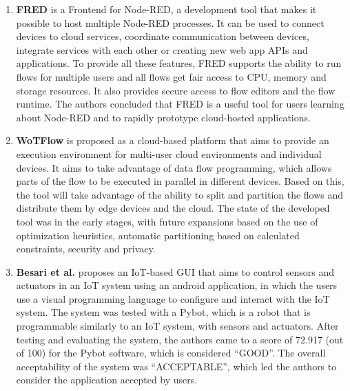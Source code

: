 \begin{enumerate}
    \item \textbf{FRED} \cite{fred} is a Frontend for Node-RED, a development tool that makes it possible to host multiple Node-RED processes. It can be used to connect devices to cloud services, coordinate communication between devices, integrate services with each other or creating new web app APIs and applications. To provide all these features, FRED supports the ability to run flows for multiple users and all flows get fair access to CPU, memory and storage resources. It also provides secure access to flow editors and the flow runtime. The authors concluded that FRED is a useful tool for users learning about Node-RED and to rapidly prototype cloud-hosted applications.
    \item \textbf{WoTFlow} \cite{wotflow_dnr} is proposed as a cloud-based platform that aims to provide an execution environment for multi-user cloud environments and individual devices. It aims to take advantage of data flow programming, which allows parts of the flow to be executed in parallel in different devices. Based on this, the tool will take advantage of the ability to split and partition the flows and distribute them by edge devices and the cloud. The state of the developed tool was in the early stages, with future expansions based on the use of optimization heuristics, automatic partitioning based on calculated constraints, security and privacy.
    \item \textbf{Besari et al.} \cite{mobile_apps_rpi} \cite{pre_mobile_apps_rpi} proposes an IoT-based GUI that aims to control sensors and actuators in an IoT system using an android application, in which the users use a visual programming language to configure and interact with the IoT system. The system was tested with a Pybot, which is a robot that is programmable similarly to an IoT system, with sensors and actuators. After testing and evaluating the system, the authors came to a score of 72.917 (out of 100) for the Pybot software, which is considered “GOOD”. The overall acceptability of the system was “ACCEPTABLE”, which led the authors to consider the application accepted by users.

\end{enumerate}
